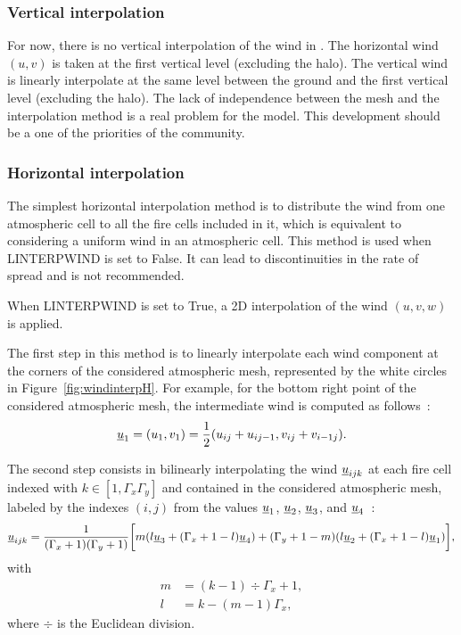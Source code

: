 \subsubsection{Vertical interpolation}

For now, there is no vertical interpolation of the wind in \Blaze.
The horizontal wind $(u, v)$ is taken at the first vertical level (excluding the halo).
The vertical wind is linearly interpolate at the same level between the ground and the first vertical level (excluding the halo).
The lack of independence between the mesh and the interpolation method is a real problem for the model.
This development should be a one of the priorities of the community. 

\subsubsection{Horizontal interpolation}

The simplest horizontal interpolation method is to distribute the wind from one atmospheric cell to all the fire cells included in it, which is equivalent to considering a uniform wind in an atmospheric cell. This method is used when LINTERPWIND is set to False. It can lead to discontinuities in the rate of spread and is not recommended.

\medskip

When LINTERPWIND is set to True, a 2D interpolation of the wind $(u,v, w)$ is applied.

The first step in this method is to linearly interpolate each wind component at the corners of the considered atmospheric mesh, represented by the white circles in Figure~\ref{fig:windinterpH}. For example, for the bottom right point of the considered atmospheric mesh, the intermediate wind is computed as follows~:
\begin{equation}
\underline{u}_1 = (u_1,v_1) = \frac{1}{2} (u_{ij} + u_{ij-1},v_{ij} + v_{i-1j}).
\end{equation}

The second step consists in bilinearly interpolating the wind $\underline{u}_{ijk}$ at each fire cell indexed with $k \in [1,\Gamma_x \Gamma_y]$ and contained in the considered atmospheric mesh, labeled by the indexes $(i,j)$ from the values $\underline{u}_1$, $\underline{u}_2$, $\underline{u}_3$, and $\underline{u}_4$~:
\begin{equation}
	  \underline{u}_{ijk} = \frac{1}{(\Gamma_x +1 ) (\Gamma_y +1)}  \bigg [ m(l \underline{u}_3 + (\Gamma_x + 1 - l) \underline{u}_4) + (\Gamma_y + 1 - m)(l \underline{u}_2 + (\Gamma_x +1 - l) \underline{u}_1) \bigg ],
\end{equation}
with
\begin{align}
  m &= (k-1) \div \Gamma_x + 1,  \\
  l &= k - (m-1)\Gamma_x,
\end{align}
where $\div$ is the Euclidean division.

